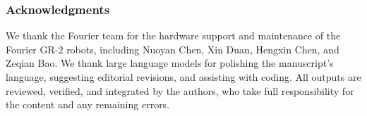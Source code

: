 \subsubsection*{Acknowledgments}
We thank the Fourier team for the hardware support and maintenance of the Fourier GR-2 robots, including Nuoyan Chen, Xin Duan, Hengxin Chen, and Zeqian Bao. We thank large language models for polishing the manuscript’s language, suggesting editorial revisions, and assisting with coding. All outputs are reviewed, verified, and integrated by the authors, who take full responsibility for the content and any remaining errors.